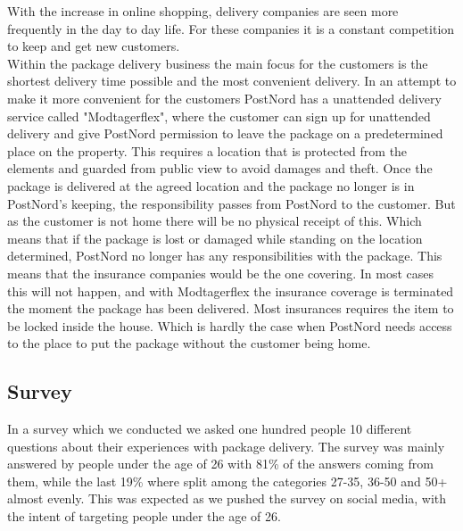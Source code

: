 \documentclass[12pt]{report}
\begin{document}
With the increase in online shopping, delivery companies are seen more frequently in the day to day life. For these companies it is a constant competition to keep and get new customers.\\
Within the package delivery business the main focus for the customers is the shortest delivery time possible and the most convenient delivery. In an attempt to make it more convenient for the customers PostNord has a unattended delivery service called "Modtagerflex", where the customer can sign up for unattended delivery and give PostNord permission to leave the package on a predetermined place on the property\cite{Unattendeddelivery}. This requires a location that is protected from the elements and guarded from public view to avoid damages and theft. Once the package is delivered at the agreed location and the package no longer is in PostNord's keeping, the responsibility passes from PostNord to the customer. But as the customer is not home there will be no physical receipt of this. Which means that if the package is lost or damaged while standing on the location determined, PostNord no longer has any responsibilities with the package. This means that the insurance companies would be the one covering. In most cases this will not happen, and with Modtagerflex the insurance coverage is terminated the moment the package has been delivered. Most insurances requires the item to be locked inside the house. Which is hardly the case when PostNord needs access to the place to put the package without the customer being home\cite{Mailman}.\\\hspace*{5 mm}

\subsection{Survey}
In a survey which we conducted we asked one hundred people 10 different questions about their experiences with package delivery. The survey was mainly answered by people under the age of 26 with 81\% of the answers coming from them, while the last 19\% where split among the categories 27-35, 36-50 and 50+ almost evenly. This was expected as we pushed the survey on social media, with the intent of targeting people under the age of 26.
\end{document}
